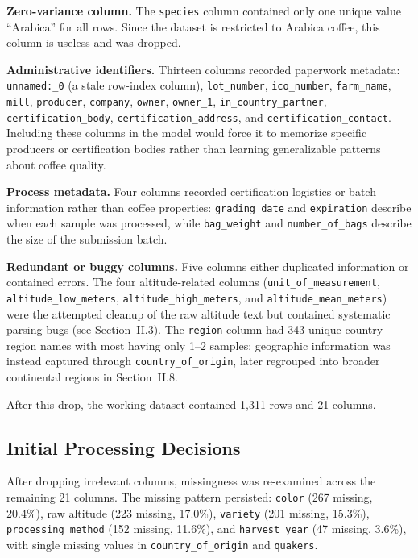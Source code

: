 \documentclass[12pt, a4paper]{article}
\begin{document}
\textbf{Zero-variance column.} The \texttt{species} column contained only one unique value
``Arabica'' for all rows. Since the dataset is restricted to Arabica coffee, this column is useless
and was dropped.

\textbf{Administrative identifiers.} Thirteen columns recorded paperwork metadata:
\texttt{unnamed:\_0} (a stale row-index column), \texttt{lot\_number}, \texttt{ico\_number},
\texttt{farm\_name}, \texttt{mill}, \texttt{producer}, \texttt{company}, \texttt{owner},
\texttt{owner\_1}, \texttt{in\_country\_partner}, \texttt{certification\_body},
\texttt{certification\_address}, and \texttt{certification\_contact}. Including these columns
in the model would force it to memorize specific producers or certification bodies rather than
learning generalizable patterns about coffee quality.

\textbf{Process metadata.} Four columns recorded certification logistics or batch information rather
than coffee properties: \texttt{grading\_date} and \texttt{expiration} describe when each sample
was processed, while \texttt{bag\_weight} and \texttt{number\_of\_bags} describe the size of
the submission batch.

\textbf{Redundant or buggy columns.} Five columns either duplicated information or contained
errors. The four altitude-related columns (\texttt{unit\_of\_measurement},
\texttt{altitude\_low\_meters}, \texttt{altitude\_high\_meters}, and
\texttt{altitude\_mean\_meters}) were the attempted cleanup of the raw altitude text but contained
systematic parsing bugs (see Section~II.3). The \texttt{region} column had 343 unique country
region names with most having only 1--2 samples; geographic information was instead captured
through \texttt{country\_of\_origin}, later regrouped into broader continental regions in
Section~II.8.

After this drop, the working dataset contained 1,311 rows and 21 columns.

\subsection{Initial Processing Decisions}

After dropping irrelevant columns, missingness was re-examined across the remaining 21 columns.
The missing pattern persisted: \texttt{color} (267 missing, 20.4\%), raw altitude (223 missing,
17.0\%), \texttt{variety} (201 missing, 15.3\%), \texttt{processing\_method} (152 missing,
11.6\%), and \texttt{harvest\_year} (47 missing, 3.6\%), with single missing values in
\texttt{country\_of\_origin} and \texttt{quakers}.
\end{document}
